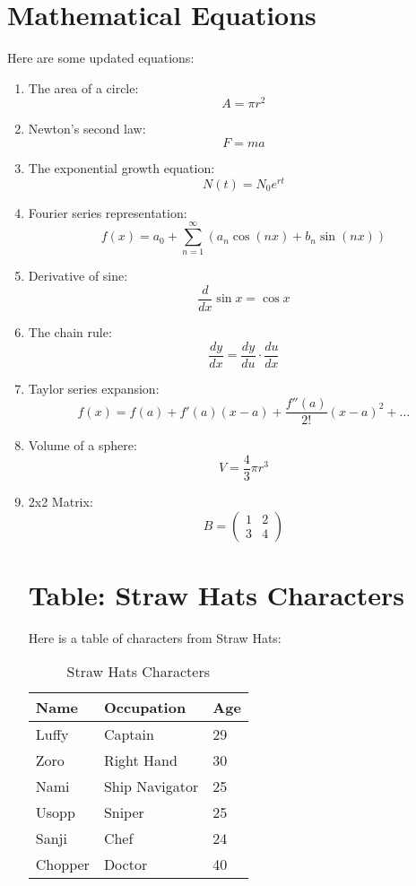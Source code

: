\documentclass{article}
\begin{document}
\section{Mathematical Equations}
Here are some updated equations:
\begin{enumerate}
    \item The area of a circle:
    \[
    A = \pi r^2
    \]
    \item Newton's second law:
    \[
    F = ma
    \]
    \item The exponential growth equation:
    \[
    N(t) = N_0 e^{rt}
    \]
    \item Fourier series representation:
    \[
    f(x) = a_0 + \sum_{n=1}^{\infty} \left( a_n \cos(nx) + b_n \sin(nx) \right)
    \]
    \item Derivative of sine:
    \[
    \frac{d}{dx}\sin x = \cos x
    \]
    \item The chain rule:
    \[
    \frac{dy}{dx} = \frac{dy}{du} \cdot \frac{du}{dx}
    \]
    \item Taylor series expansion:
    \[
    f(x) = f(a) + f'(a)(x - a) + \frac{f''(a)}{2!}(x - a)^2 + \dots
    \]
    \item Volume of a sphere:
    \[
    V = \frac{4}{3} \pi r^3
    \]
    \item 2x2 Matrix:
    \[
    B = \begin{pmatrix}
    1 & 2 \\
    3 & 4
    \end{pmatrix}
    \]


\section{Table: Straw Hats Characters}
Here is a table of characters from Straw Hats:
\begin{table}[h]
    \centering
    \caption{Straw Hats Characters}
    \begin{tabular}{@{}lll@{}}
        \toprule
        \textbf{Name} & \textbf{Occupation}      & \textbf{Age} \\ \midrule
        Luffy         & Captain                     & 29           \\
        Zoro          & Right Hand                  & 30           \\
        Nami          & Ship Navigator              & 25           \\
        Usopp         & Sniper                      & 25           \\
        Sanji         & Chef                        & 24           \\ 
        Chopper       & Doctor                      & 40           \\ \bottomrule
    \end{tabular}
\end{table}
\end{enumerate}
\end{document}
